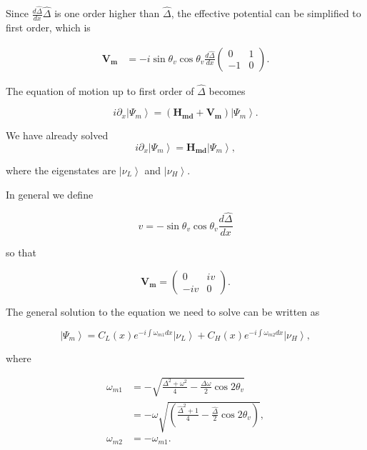 \documentclass{tufte-handout}
\newcommand{\ket}[1]{\left| #1\right\rangle}
\begin{document}
Since $\frac{d\hat\Delta}{dx} \hat\Delta$ is one order higher than $\hat\Delta$, the effective potential can be simplified to first order, which is

\begin{align*}
\mathbf{V_m} & = - i\sin\theta_v \cos\theta_v \frac{d\hat\Delta}{dx} \begin{pmatrix}
0 & 1 \\
-1 & 0
\end{pmatrix}.
\end{align*}

The equation of motion up to first order of $\hat\Delta$ becomes

\begin{equation*}
i\partial_x\ket{\Psi_m} = (\mathbf{H_{md}} + \mathbf{V_m})\ket{\Psi_m}.
\end{equation*}

We have already solved
\begin{equation*}
i\partial_x\ket{\Psi_m} = \mathbf{H_{md}} \ket{\Psi_m},
\end{equation*}

where the eigenstates are $\ket{\nu_L}$ and $\ket{\nu_H}$.


In general we define

\begin{equation*}
v = -\sin\theta_v \cos\theta_v\frac{d\hat\Delta}{dx}
\end{equation*}

so that

\begin{equation*}
\mathbf{V_m} = \begin{pmatrix}
0 & i v \\
-i v & 0
\end{pmatrix}.
\end{equation*}

The general solution to the equation we need to solve can be written as

\begin{equation*}
\ket{\Psi_m} = C_L(x) e^{-i\int \omega_{m1} dx} \ket{\nu_L} + C_H(x) e^{-i\int \omega_{m2} dx} \ket{\nu_H},
\end{equation*}

where

\begin{align*}
\omega_{m1} &=-\sqrt{ \frac{\Delta^2 + \omega^2}{4}-\frac{\Delta \omega}{2} \cos 2\theta_v } \\
& = -\omega \sqrt{\left( \frac{\hat\Delta^2 + 1}{4} - \frac{\hat\Delta}{2}\cos 2\theta_v \right)} , \\
\omega_{m2} & = - \omega_{m1}.
\end{align*}
\end{document}
